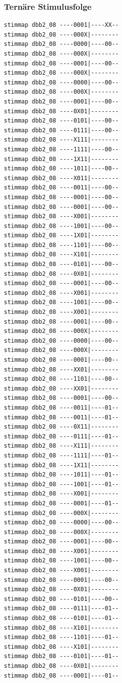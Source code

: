 \documentclass[fleqn]{article}
\begin{document}
\subsubsection{Ternäre Stimulusfolge}
\begin{lstlisting}
stimmap dbb2_08 ----0001|----XX--
stimmap dbb2_08 ----000X|--------
stimmap dbb2_08 ----0000|----00--
stimmap dbb2_08 ----000X|--------
stimmap dbb2_08 ----0001|----00--
stimmap dbb2_08 ----000X|--------
stimmap dbb2_08 ----0000|----00--
stimmap dbb2_08 ----000X|--------
stimmap dbb2_08 ----0001|----00--
stimmap dbb2_08 ----0X01|--------
stimmap dbb2_08 ----0101|----00--
stimmap dbb2_08 ----0111|----00--
stimmap dbb2_08 ----X111|--------
stimmap dbb2_08 ----1111|----00--
stimmap dbb2_08 ----1X11|--------
stimmap dbb2_08 ----1011|----00--
stimmap dbb2_08 ----X011|--------
stimmap dbb2_08 ----0011|----00--
stimmap dbb2_08 ----0001|----00--
stimmap dbb2_08 ----0001|----00--
stimmap dbb2_08 ----X001|--------
stimmap dbb2_08 ----1001|----00--
stimmap dbb2_08 ----1X01|--------
stimmap dbb2_08 ----1101|----00--
stimmap dbb2_08 ----X101|--------
stimmap dbb2_08 ----0101|----00--
stimmap dbb2_08 ----0X01|--------
stimmap dbb2_08 ----0001|----00--
stimmap dbb2_08 ----X001|--------
stimmap dbb2_08 ----1001|----00--
stimmap dbb2_08 ----X001|--------
stimmap dbb2_08 ----0001|----00--
stimmap dbb2_08 ----000X|--------
stimmap dbb2_08 ----0000|----00--
stimmap dbb2_08 ----000X|--------
stimmap dbb2_08 ----0001|----00--
stimmap dbb2_08 ----XX01|--------
stimmap dbb2_08 ----1101|----00--
stimmap dbb2_08 ----XX01|--------
stimmap dbb2_08 ----0001|----00--
stimmap dbb2_08 ----0011|----01--
stimmap dbb2_08 ----0011|----01--
stimmap dbb2_08 ----0X11|--------
stimmap dbb2_08 ----0111|----01--
stimmap dbb2_08 ----X111|--------
stimmap dbb2_08 ----1111|----01--
stimmap dbb2_08 ----1X11|--------
stimmap dbb2_08 ----1011|----01--
stimmap dbb2_08 ----1001|----01--
stimmap dbb2_08 ----X001|--------
stimmap dbb2_08 ----0001|----01--
stimmap dbb2_08 ----000X|--------
stimmap dbb2_08 ----0000|----00--
stimmap dbb2_08 ----000X|--------
stimmap dbb2_08 ----0001|----00--
stimmap dbb2_08 ----X001|--------
stimmap dbb2_08 ----1001|----00--
stimmap dbb2_08 ----X001|--------
stimmap dbb2_08 ----0001|----00--
stimmap dbb2_08 ----0X01|--------
stimmap dbb2_08 ----0101|----00--
stimmap dbb2_08 ----0111|----01--
stimmap dbb2_08 ----0101|----01--
stimmap dbb2_08 ----X101|--------
stimmap dbb2_08 ----1101|----01--
stimmap dbb2_08 ----X101|--------
stimmap dbb2_08 ----0101|----01--
stimmap dbb2_08 ----0X01|--------
stimmap dbb2_08 ----0001|----01--

\end{lstlisting}
\end{document}
